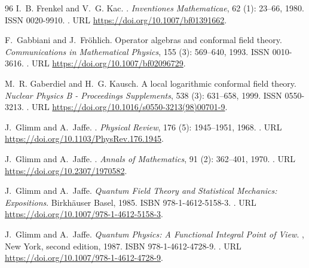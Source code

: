 \documentclass[a4paper, 11pt]{article}
\DeclareMathOperator{\1}{\mathds{1}}
\begin{document}
\begin{thebibliography}{96}
I.~B. Frenkel and V.~G. Kac.
.
\newblock \emph{Inventiones Mathematicae}, 62 (1): 23--66,
  1980.
\newblock ISSN 0020-9910.
\newblock {}.
\newblock URL \url{https://doi.org/10.1007/bf01391662}.

F.~Gabbiani and J.~Fröhlich.
\newblock Operator algebras and conformal field theory.
\newblock \emph{Communications in Mathematical Physics}, 155
  (3): 569--640, 1993.
\newblock ISSN 0010-3616.
\newblock {}.
\newblock URL \url{https://doi.org/10.1007/bf02096729}.

M.~R. Gaberdiel and H.~G. Kausch.
\newblock A local logarithmic conformal field theory.
\newblock \emph{Nuclear Physics B - Proceedings Supplements}, 538
  (3): 631--658, 1999.
\newblock ISSN 0550-3213.
\newblock {}.
\newblock URL \url{https://doi.org/10.1016/s0550-3213(98)00701-9}.

J.~Glimm and A.~Jaffe.
.
\newblock \emph{Physical Review}, 176 (5): 1945--1951, 1968.
\newblock {}.
\newblock URL \url{https://doi.org/10.1103/PhysRev.176.1945}.

J.~Glimm and A.~Jaffe.
.
\newblock \emph{Annals of Mathematics}, 91 (2): 362--401,
  1970.
\newblock {}.
\newblock URL \url{https://doi.org/10.2307/1970582}.

J.~Glimm and A.~Jaffe.
\newblock \emph{{Quantum Field Theory and Statistical Mechanics: Expositions}}.
\newblock Birkhäuser Basel, 1985.
\newblock ISBN 978-1-4612-5158-3.
\newblock {}.
\newblock URL \url{https://doi.org/10.1007/978-1-4612-5158-3}.

J.~Glimm and A.~Jaffe.
\newblock \emph{Quantum {{Physics}}: {{A Functional Integral Point}} of
  {{View}}}.
, {New York}, second edition, 1987.
\newblock ISBN 978-1-4612-4728-9.
\newblock {}.
\newblock URL \url{https://doi.org/10.1007/978-1-4612-4728-9}.


\end{thebibliography}
\end{document}
